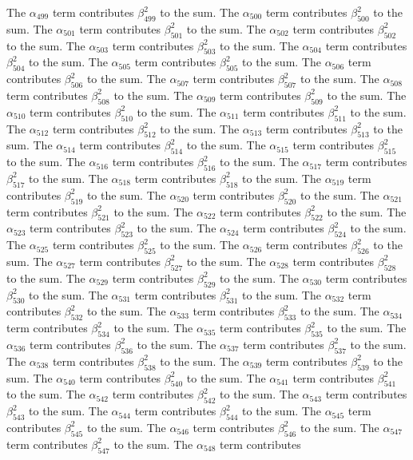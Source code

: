 \begin{lemma}
The $\alpha_{499}$ term contributes $\beta_{499}^{2}$ to the sum. The $\alpha_{500}$ term contributes $\beta_{500}^{2}$ to the sum. The $\alpha_{501}$ term contributes $\beta_{501}^{2}$ to the sum. The $\alpha_{502}$ term contributes $\beta_{502}^{2}$ to the sum. The $\alpha_{503}$ term contributes $\beta_{503}^{2}$ to the sum. The $\alpha_{504}$ term contributes $\beta_{504}^{2}$ to the sum. The $\alpha_{505}$ term contributes $\beta_{505}^{2}$ to the sum. The $\alpha_{506}$ term contributes $\beta_{506}^{2}$ to the sum. The $\alpha_{507}$ term contributes $\beta_{507}^{2}$ to the sum. The $\alpha_{508}$ term contributes $\beta_{508}^{2}$ to the sum. The $\alpha_{509}$ term contributes $\beta_{509}^{2}$ to the sum. The $\alpha_{510}$ term contributes $\beta_{510}^{2}$ to the sum. The $\alpha_{511}$ term contributes $\beta_{511}^{2}$ to the sum. The $\alpha_{512}$ term contributes $\beta_{512}^{2}$ to the sum. The $\alpha_{513}$ term contributes $\beta_{513}^{2}$ to the sum. The $\alpha_{514}$ term contributes $\beta_{514}^{2}$ to the sum. The $\alpha_{515}$ term contributes $\beta_{515}^{2}$ to the sum. The $\alpha_{516}$ term contributes $\beta_{516}^{2}$ to the sum. The $\alpha_{517}$ term contributes $\beta_{517}^{2}$ to the sum. The $\alpha_{518}$ term contributes $\beta_{518}^{2}$ to the sum. The $\alpha_{519}$ term contributes $\beta_{519}^{2}$ to the sum. The $\alpha_{520}$ term contributes $\beta_{520}^{2}$ to the sum. The $\alpha_{521}$ term contributes $\beta_{521}^{2}$ to the sum. The $\alpha_{522}$ term contributes $\beta_{522}^{2}$ to the sum. The $\alpha_{523}$ term contributes $\beta_{523}^{2}$ to the sum. The $\alpha_{524}$ term contributes $\beta_{524}^{2}$ to the sum. The $\alpha_{525}$ term contributes $\beta_{525}^{2}$ to the sum. The $\alpha_{526}$ term contributes $\beta_{526}^{2}$ to the sum. The $\alpha_{527}$ term contributes $\beta_{527}^{2}$ to the sum. The $\alpha_{528}$ term contributes $\beta_{528}^{2}$ to the sum. The $\alpha_{529}$ term contributes $\beta_{529}^{2}$ to the sum. The $\alpha_{530}$ term contributes $\beta_{530}^{2}$ to the sum. The $\alpha_{531}$ term contributes $\beta_{531}^{2}$ to the sum. The $\alpha_{532}$ term contributes $\beta_{532}^{2}$ to the sum. The $\alpha_{533}$ term contributes $\beta_{533}^{2}$ to the sum. The $\alpha_{534}$ term contributes $\beta_{534}^{2}$ to the sum. The $\alpha_{535}$ term contributes $\beta_{535}^{2}$ to the sum. The $\alpha_{536}$ term contributes $\beta_{536}^{2}$ to the sum. The $\alpha_{537}$ term contributes $\beta_{537}^{2}$ to the sum. The $\alpha_{538}$ term contributes $\beta_{538}^{2}$ to the sum. The $\alpha_{539}$ term contributes $\beta_{539}^{2}$ to the sum. The $\alpha_{540}$ term contributes $\beta_{540}^{2}$ to the sum. The $\alpha_{541}$ term contributes $\beta_{541}^{2}$ to the sum. The $\alpha_{542}$ term contributes $\beta_{542}^{2}$ to the sum. The $\alpha_{543}$ term contributes $\beta_{543}^{2}$ to the sum. The $\alpha_{544}$ term contributes $\beta_{544}^{2}$ to the sum. The $\alpha_{545}$ term contributes $\beta_{545}^{2}$ to the sum. The $\alpha_{546}$ term contributes $\beta_{546}^{2}$ to the sum. The $\alpha_{547}$ term contributes $\beta_{547}^{2}$ to the sum. The $\alpha_{548}$ term contributes 
\end{lemma}
